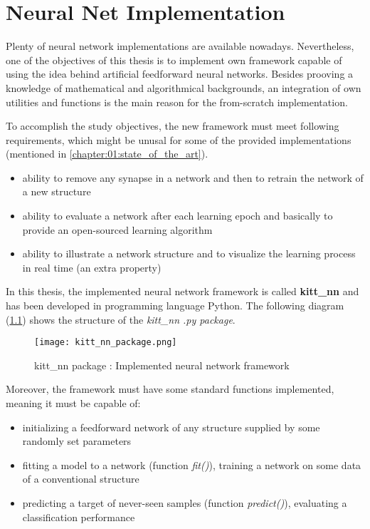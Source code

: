 \chapter{Neural Net Implementation} \label{chap:kitt_nn}
Plenty of neural network implementations are available nowadays. Nevertheless, one of the objectives of this thesis is to implement own framework capable of using the idea behind artificial feedforward neural networks. Besides prooving a knowledge of mathematical and algorithmical backgrounds, an integration of own utilities and functions is the main reason for the from-scratch implementation.

To accomplish the study objectives, the new framework must meet following requirements, which might be unusal for some of the provided implementations (mentioned in \cref{chapter:01:state_of_the_art}).

\begin{itemize}
\item ability to remove any synapse in a network and then to retrain the network of a new structure
\item ability to evaluate a network after each learning epoch and basically to provide an open-sourced learning algorithm
\item ability to illustrate a network structure and to visualize the learning process in real time (an extra property)
\end{itemize}

In this thesis, the implemented neural network framework is called \textbf{kitt\_nn} and has been developed in programming language Python. The following diagram (\ref{img:kitt_nn_package}) shows the structure of the \textit{kitt\_nn .py package}.

\begin{figure}[H]
  \centering
  \texttt{[image: kitt\_nn\_package.png]}
  \caption{kitt\_nn package : Implemented neural network framework}
  \label{img:kitt_nn_package}
\end{figure}

Moreover, the framework must have some standard functions implemented, meaning it must be capable of:

\begin{itemize}
\item initializing a feedforward network of any structure supplied by some randomly set parameters
\item fitting a model to a network (function \textit{fit()}), training a network on some data of a conventional structure
\item predicting a target of never-seen samples (function \textit{predict()}), evaluating a classification performance
\end{itemize}

